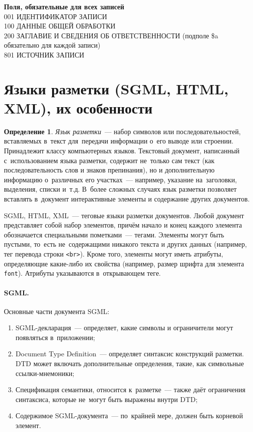 \documentclass[12pt]{article}
\theoremstyle{definition}
\newtheorem*{defn}{Определение}
\theoremstyle{remark}
\numberwithin{equation}{section}
\begin{document}
\textbf{Поля, обязательные для всех записей}
\\
001 ИДЕНТИФИКАТОР ЗАПИСИ \\
100 ДАННЫЕ ОБЩЕЙ ОБРАБОТКИ \\
200 ЗАГЛАВИЕ И СВЕДЕНИЯ ОБ ОТВЕТСТВЕННОСТИ (подполе \$a обязательно для каждой записи) \\
801 ИСТОЧНИК ЗАПИСИ \\

\section{Языки разметки (SGML, HTML, XML), их особенности}
\begin{defn}
{\sl Язык разметки}~--- набор символов или последовательностей,
вставляемых в~текст для~передачи информации о~его выводе или строении.
Принадлежит классу компьютерных языков. Текстовый документ, написанный
с~использованием языка разметки, содержит не~только сам текст (как
последовательность слов и знаков препинания), но и дополнительную
информацию о~различных его участках~--- например, указание на~заголовки,
выделения, списки и~т.д. В~более сложных случаях язык разметки
позволяет вставлять в~документ интерактивные элементы и содержание
других документов.
\end{defn}
SGML, HTML, XML~--- теговые языки разметки документов. Любой документ
представляет собой набор элементов, причём начало и конец каждого
элемента обозначается специальными пометками~--- тегами. Элементы
могут быть пустыми, то~есть не~содержащими никакого текста и других
данных (например, тег перевода строки \texttt{<br>}). Кроме того,
элементы могут иметь атрибуты, определяющие какие\nobreakdash-либо
их свойства (например, размер шрифта для элемента \texttt{font}).
Атрибуты указываются в~открывающем теге.

\paragraph{SGML.}
Основные части документа SGML:
\begin{enumerate}
	\item SGML-декларация~--- определяет, какие символы и ограничители
    могут появляться в~приложении;
	\item Document Type Definition~--- определяет синтаксис конструкций
    разметки. DTD может включать дополнительные определения, такие,
    как символьные ссылки\nobreakdash-мнемоники;
	\item Спецификация семантики, относится к~разметке~--- также
    даёт ограничения синтаксиса, которые не~могут быть выражены
    внутри DTD;
	\item Содержимое SGML\nobreakdash-документа~--- по~крайней мере,
    должен быть корневой элемент.
\end{enumerate}
\end{document}
